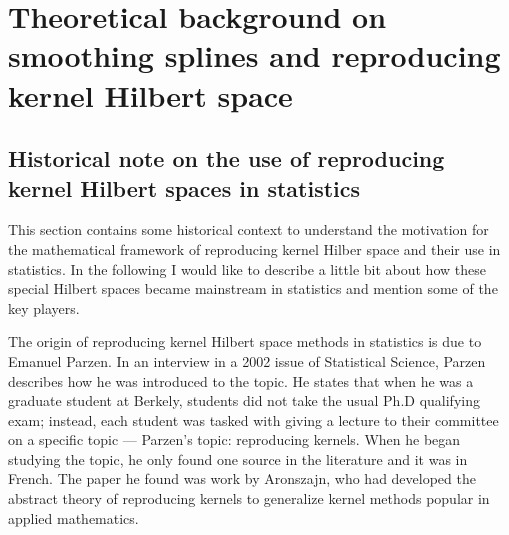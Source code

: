 \section{Theoretical background on smoothing splines and reproducing kernel Hilbert space}
 \label{ch:theoretical background}


\subsection{Historical note on the use of reproducing kernel Hilbert spaces in statistics}

This section contains some historical context to understand the motivation for the mathematical framework of reproducing kernel Hilber space and their use in statistics. In the following I would like to describe a little bit about how these special Hilbert spaces became mainstream in statistics and mention some of the key players. 


The origin of reproducing kernel Hilbert space methods in statistics is due to Emanuel Parzen. In an interview in a 2002 issue of Statistical Science, Parzen describes how he was introduced to the topic. He states that when he was a graduate student at Berkely, students did not take the usual Ph.D qualifying exam; instead, each student was tasked with giving a lecture to their committee on a specific topic --- Parzen's topic: reproducing kernels. When he began studying the topic, he only found one source in the literature and it was in French. The paper he found was work by Aronszajn, who had developed the abstract theory of reproducing kernels to generalize kernel methods popular in applied mathematics. 

